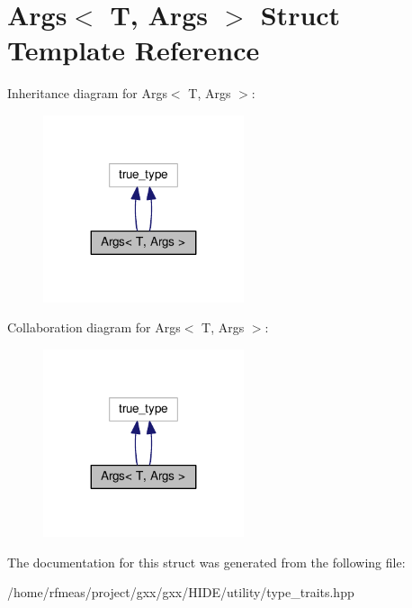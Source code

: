 \hypertarget{structArgs}{}\section{Args$<$ T, Args $>$ Struct Template Reference}
\label{structArgs}


Inheritance diagram for Args$<$ T, Args $>$\+:
\nopagebreak
\begin{figure}[H]
\begin{center}
\leavevmode
\includegraphics[width=167pt]{structArgs__inherit__graph}
\end{center}
\end{figure}


Collaboration diagram for Args$<$ T, Args $>$\+:
\nopagebreak
\begin{figure}[H]
\begin{center}
\leavevmode
\includegraphics[width=167pt]{structArgs__coll__graph}
\end{center}
\end{figure}


The documentation for this struct was generated from the following file\+:\begin{DoxyCompactItemize}
\item 
/home/rfmeas/project/gxx/gxx/\+H\+I\+D\+E/utility/type\+\_\+traits.\+hpp\end{DoxyCompactItemize}
